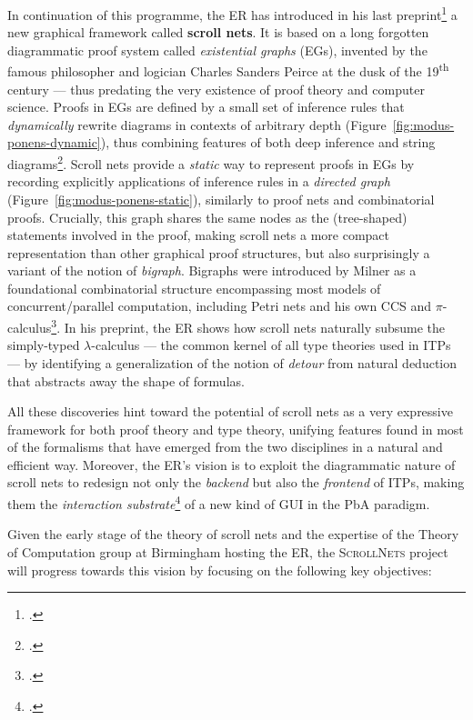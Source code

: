 \documentclass[12pt,draftproposal]{msca-pf}
\newcommand{\proj}{\small\textsc{ScrollNets}}
\begin{document}
In continuation of this programme, the ER has introduced in his last
preprint\footcite{donatoScrollNets2025} a new graphical framework called \textbf{scroll nets}. It is
based on a long forgotten diagrammatic proof system called \emph{existential graphs} (EGs), invented
by the famous philosopher and logician Charles Sanders Peirce at the dusk of the
19\textsuperscript{th} century --- thus predating the very existence of proof theory and computer
science. Proofs in EGs are defined by a small set of inference rules that \emph{dynamically} rewrite
diagrams in contexts of arbitrary depth (Figure~\ref{fig:modus-ponens-dynamic}), thus combining
features of both deep inference and string diagrams\footcite{bonchi_diagrammatic_2024}. Scroll nets
provide a \emph{static} way to represent proofs in EGs by recording explicitly applications of
inference rules in a \emph{directed graph} (Figure~\ref{fig:modus-ponens-static}), similarly to
proof nets and combinatorial proofs. Crucially, this graph shares the same nodes as the
(tree-shaped) statements involved in the proof, making scroll nets a more compact representation
than other graphical proof structures, but also surprisingly a variant of the notion of
\emph{bigraph}. Bigraphs were introduced by Milner as a foundational combinatorial structure
encompassing most models of concurrent/parallel computation, including Petri nets and his own CCS
and $\pi$-calculus\footcite{milnerBigraphicalReactiveSystems2001}. In his preprint, the ER shows how
scroll nets naturally subsume the simply-typed $\lambda$-calculus --- the common kernel of all type
theories used in ITPs --- by identifying a generalization of the notion of \emph{detour} from
natural deduction that abstracts away the shape of formulas.

All these discoveries hint toward the potential of scroll nets as a very expressive framework for
both proof theory and type theory, unifying features found in most of the formalisms that have
emerged from the two disciplines in a natural and efficient way. Moreover, the ER's vision is to
exploit the diagrammatic nature of scroll nets to redesign not only the \emph{backend} but also the
\emph{frontend} of ITPs, making them the \emph{interaction
substrate}\footcite{mackayInteractionSubstratesCombining2025} of a new kind of GUI in the PbA
paradigm.

Given the early stage of the theory of scroll nets and the expertise of the Theory of Computation
group at Birmingham hosting the ER, the {\proj} project will progress towards this vision by
focusing on the following key objectives:
\end{document}
